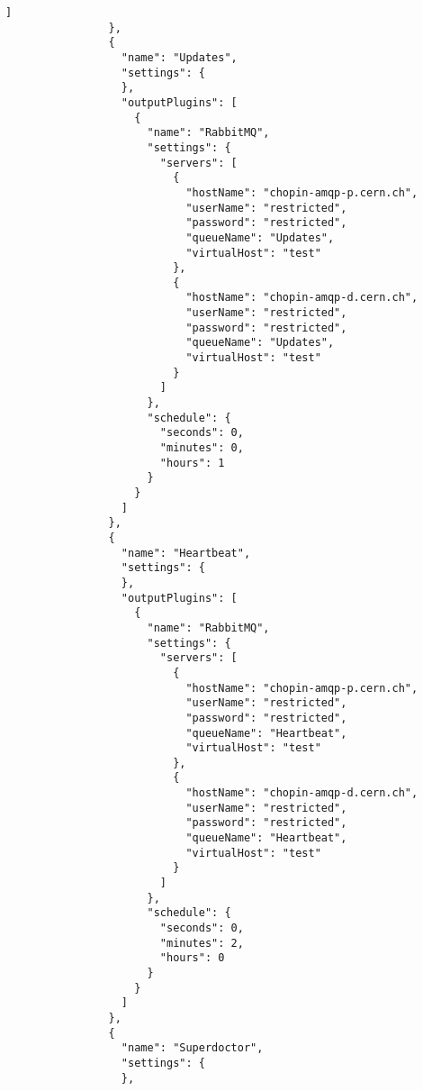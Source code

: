 \begin{lstlisting}[style=csharp, caption=Fichero de configuración]
                  ]
                },
                {
                  "name": "Updates",
                  "settings": {
                  },
                  "outputPlugins": [
                    {
                      "name": "RabbitMQ",
                      "settings": {
                        "servers": [
                          {
                            "hostName": "chopin-amqp-p.cern.ch",
                            "userName": "restricted",
                            "password": "restricted",
                            "queueName": "Updates",
                            "virtualHost": "test"
                          },
                          {
                            "hostName": "chopin-amqp-d.cern.ch",
                            "userName": "restricted",
                            "password": "restricted",
                            "queueName": "Updates",
                            "virtualHost": "test"
                          }
                        ]
                      },
                      "schedule": {
                        "seconds": 0,
                        "minutes": 0,
                        "hours": 1
                      }
                    }
                  ]
                },
                {
                  "name": "Heartbeat",
                  "settings": {
                  },
                  "outputPlugins": [
                    {
                      "name": "RabbitMQ",
                      "settings": {
                        "servers": [
                          {
                            "hostName": "chopin-amqp-p.cern.ch",
                            "userName": "restricted",
                            "password": "restricted",
                            "queueName": "Heartbeat",
                            "virtualHost": "test"
                          },
                          {
                            "hostName": "chopin-amqp-d.cern.ch",
                            "userName": "restricted",
                            "password": "restricted",
                            "queueName": "Heartbeat",
                            "virtualHost": "test"
                          }
                        ]
                      },
                      "schedule": {
                        "seconds": 0,
                        "minutes": 2,
                        "hours": 0
                      }
                    }
                  ]
                },
                {
                  "name": "Superdoctor",
                  "settings": {
                  },

\end{lstlisting}
